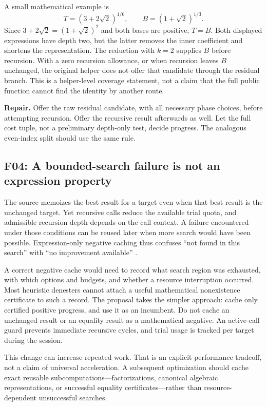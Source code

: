 \documentclass[11pt,letterpaper]{article}
\numberwithin{equation}{section}
\theoremstyle{definition}\newtheorem{definition}[theorem]{Definition}
\theoremstyle{remark}\newtheorem{remark}[theorem]{Remark}
\newcommand{\code}[1]{\texttt{\detokenize{#1}}}
\newcommand{\finding}[2]{\subsection{#1: #2}}
\begin{document}
A small mathematical example is
\begin{equation}
T=(3+2\sqrt2)^{1/6},\qquad B=(1+\sqrt2)^{1/3}.
\label{eq:index-example}
\end{equation}
Since $3+2\sqrt2=(1+\sqrt2)^2$ and both bases are positive, $T=B$. Both displayed expressions have depth two, but the latter removes the inner coefficient and shortens the representation. The reduction with $k=2$ supplies $B$ before recursion. With a zero recursion allowance, or when recursion leaves $B$ unchanged, the original helper does not offer that candidate through the residual branch. This is a helper-level coverage statement, not a claim that the full public function cannot find the identity by another route.

\textbf{Repair.} Offer the raw residual candidate, with all necessary phase choices, before attempting recursion. Offer the recursive result afterwards as well. Let the full cost tuple, not a preliminary depth-only test, decide progress. The analogous even-index split should use the same rule.

\finding{F04}{A bounded-search failure is not an expression property}
The source memoizes the best result for a target even when that best result is the unchanged target. Yet recursive calls reduce the available trial quota, and admissible recursion depth depends on the call context. A failure encountered under those conditions can be reused later when more search would have been possible. Expression-only negative caching thus confuses ``not found in this search'' with ``no improvement available'' \cite{source}.

A correct negative cache would need to record what search region was exhausted, with which options and budgets, and whether a resource interruption occurred. Most heuristic denesters cannot attach a useful mathematical nonexistence certificate to such a record. The proposal takes the simpler approach: cache only certified positive progress, and use it as an incumbent. Do not cache an unchanged result or an \code{"Unknown"} equality result as a mathematical negative. An active-call guard prevents immediate recursive cycles, and trial usage is tracked per target during the session.

This change can increase repeated work. That is an explicit performance tradeoff, not a claim of universal acceleration. A subsequent optimization should cache exact reusable subcomputations---factorizations, canonical algebraic representations, or successful equality certificates---rather than resource-dependent unsuccessful searches.
\end{document}
